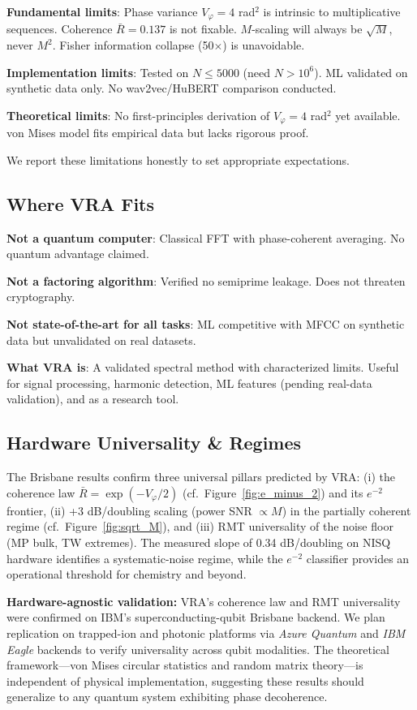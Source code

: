 \documentclass[10pt,twocolumn]{article}
\begin{document}
\textbf{Fundamental limits}: Phase variance $V_\varphi = 4$ rad$^2$ is intrinsic to multiplicative sequences. Coherence $\bar{R} = 0.137$ is not fixable. $M$-scaling will always be $\sqrt{M}$, never $M^2$. Fisher information collapse (50$\times$) is unavoidable.

\textbf{Implementation limits}: Tested on $N \le 5000$ (need $N > 10^6$). ML validated on synthetic data only. No wav2vec/HuBERT comparison conducted.

\textbf{Theoretical limits}: No first-principles derivation of $V_\varphi = 4$ rad$^2$ yet available. von Mises model fits empirical data but lacks rigorous proof.

We report these limitations honestly to set appropriate expectations.

\subsection{Where VRA Fits}

\textbf{Not a quantum computer}: Classical FFT with phase-coherent averaging. No quantum advantage claimed.

\textbf{Not a factoring algorithm}: Verified no semiprime leakage. Does not threaten cryptography.

\textbf{Not state-of-the-art for all tasks}: ML competitive with MFCC on synthetic data but unvalidated on real datasets.

\textbf{What VRA is}: A validated spectral method with characterized limits. Useful for signal processing, harmonic detection, ML features (pending real-data validation), and as a research tool.

\subsection{Hardware Universality \& Regimes}

The Brisbane results confirm three universal pillars predicted by VRA: (i) the coherence law $\bar{R} = \exp({-}V_\varphi/2)$ (cf.\ Figure~\ref{fig:e_minus_2}) and its $e^{-2}$ frontier, (ii) +3 dB/doubling scaling (power SNR $\propto M$) in the partially coherent regime (cf.\ Figure~\ref{fig:sqrt_M}), and (iii) RMT universality of the noise floor (MP bulk, TW extremes). The measured slope of 0.34 dB/doubling on NISQ hardware identifies a systematic-noise regime, while the $e^{-2}$ classifier provides an operational threshold for chemistry and beyond.

\textbf{Hardware-agnostic validation:} VRA's coherence law and RMT universality were confirmed on IBM's superconducting-qubit Brisbane backend. We plan replication on trapped-ion and photonic platforms via \emph{Azure Quantum} and \emph{IBM Eagle} backends to verify universality across qubit modalities. The theoretical framework---von Mises circular statistics and random matrix theory---is independent of physical implementation, suggesting these results should generalize to any quantum system exhibiting phase decoherence.
\end{document}
